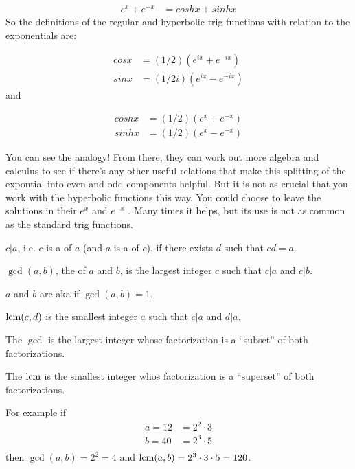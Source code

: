 \begin{align*}
e^x + e^{-x} &= cosh x + sinh x
\end{align*}
So the definitions of the regular and hyperbolic trig functions with relation to the exponentials
are:

\begin{align*}
cos x &= (1/2) ( e^{ix} + e^{-ix} ) \\
sin x &= (1/2i) ( e^{ix} - e^{-ix} )
\end{align*}
and

\begin{align*}
cosh x &= (1/2) ( e^x + e^{-x} ) \\
sinh x &= (1/2) ( e^x - e^{-x} )
\end{align*}

You can see the analogy! From there, they can work out more algebra and calculus to see if there's
any other useful relations that make this splitting of the expontial into even and odd components
helpful. But it is not as crucial that you work with the hyperbolic functions this way. You could
choose to leave the solutions in their $e^{x}$ and $e^{-x}$ . Many times it helps, but its use is
not as common as the standard trig functions.


\begin{definition*}

 $c | a$, i.e. $c$ is a  of $a$ (and $a$ is a  of $c$), if there exists $d$ such that $cd = a$.

 $\gcd(a, b)$, the  of $a$ and $b$, is the largest integer $c$ such that $c | a$ and $c | b$.

  $a$ and $b$ are  aka  if $\gcd(a, b) = 1$.

  $\text{lcm}(c, d)$ is the smallest integer $a$ such that $c|a$ and $d|a$.
\end{definition*}

\begin{remark*}
  The $\gcd$ is the largest integer whose factorization is a ``subset​'' of both factorizations.

  The $\text{lcm}$ is the smallest integer whos factorization is a ``superset​'' of both factorizations.

  For example if
  \begin{align*}
    a = 12 &= 2^2 \cdot 3 \\
    b = 40 &= 2^3 \cdot 5 \\
  \end{align*}
  then $\gcd(a, b) = 2^2 = 4$ and $\text{lcm}(a, b) = 2^3 \cdot 3 \cdot 5 = 120$.

\end{remark*}


